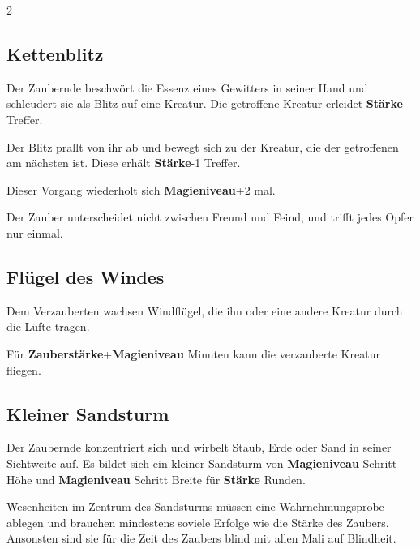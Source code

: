 \begin{multicols*}{2}
\subsection{Kettenblitz}

Der Zaubernde beschwört die Essenz eines Gewitters in seiner Hand und schleudert sie als Blitz auf eine Kreatur. Die getroffene Kreatur erleidet \textbf{Stärke} Treffer.

Der Blitz prallt von ihr ab und bewegt sich zu der Kreatur, die der getroffenen am nächsten ist. Diese erhält \textbf{Stärke}-1 Treffer.

Dieser Vorgang wiederholt sich \textbf{Magieniveau}+2 mal.

Der Zauber unterscheidet nicht zwischen Freund und Feind, und trifft jedes Opfer nur einmal.



\subsection{Flügel des Windes}

Dem Verzauberten wachsen Windflügel, die ihn oder eine andere Kreatur durch die Lüfte tragen.

Für \textbf{Zauberstärke}+\textbf{Magieniveau} Minuten kann die verzauberte Kreatur fliegen.



\subsection{Kleiner Sandsturm}

Der Zaubernde konzentriert sich und wirbelt Staub, Erde oder Sand in seiner Sichtweite auf. Es bildet sich ein kleiner Sandsturm von \textbf{Magieniveau} Schritt Höhe und \textbf{Magieniveau} Schritt Breite für \textbf{Stärke} Runden.

Wesenheiten im Zentrum des Sandsturms müssen eine Wahrnehmungsprobe ablegen und brauchen mindestens soviele Erfolge wie die Stärke des Zaubers. Ansonsten sind sie für die Zeit des Zaubers blind mit allen Mali auf Blindheit.




\end{multicols*}
